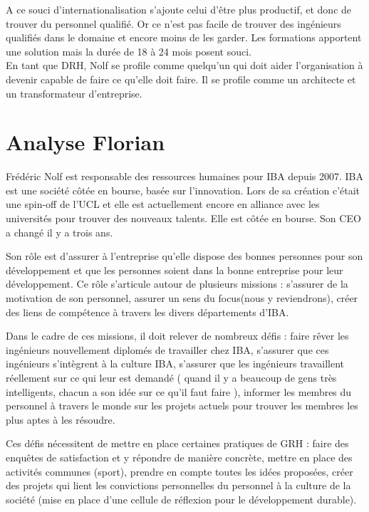 \documentclass[12pt]{article}
\begin{document}
A ce souci d'internationalisation s'ajoute celui d'être plus productif, et donc de trouver du personnel qualifié. Or ce n'est pas facile de trouver des ingénieurs qualifiés dans le domaine et encore moins de les garder. Les formations apportent une solution mais la durée de 18 à 24 mois posent souci.\\ 

En tant que DRH, Nolf se profile comme quelqu'un qui doit aider l'organisation à devenir capable de faire ce qu'elle doit faire. Il se profile comme un architecte et un transformateur d'entreprise.

\section{Analyse Florian}

Frédéric Nolf est responsable des ressources humaines pour IBA depuis 2007. IBA est une société côtée en bourse, basée sur l'innovation. Lors de sa création c'était une spin-off de l'UCL et elle est actuellement encore en alliance avec les universités pour trouver des nouveaux talents. Elle est côtée en bourse. Son CEO a changé il y a trois ans.

Son rôle est d'assurer à l'entreprise qu'elle dispose des bonnes personnes pour son développement et que les personnes soient dans la bonne entreprise pour leur développement. Ce rôle s'articule autour de plusieurs missions : s'assurer de la motivation de son personnel, assurer un \og{} sens du focus\fg{}(nous y reviendrons), créer des liens de compétence à travers les divers départements d'IBA.

Dans le cadre de ces missions, il doit relever de nombreux défis : faire rêver les ingénieurs nouvellement diplomés de travailler chez IBA, s'assurer que ces ingénieurs s'intègrent à la culture IBA, s'assurer que les ingénieurs travaillent réellement sur ce qui leur est demandé (\og{} quand il y a beaucoup de gens très intelligents, chacun a son idée sur ce qu'il faut faire \fg{}), informer les membres du personnel à travers le monde sur les projets actuels pour trouver les membres les plus aptes à les résoudre.

Ces défis nécessitent de mettre en place certaines pratiques de GRH : faire des enquêtes de satisfaction et y répondre de manière concrète, mettre en place des activités communes (sport), prendre en compte toutes les idées proposées, créer des projets qui lient les convictions personnelles du personnel à la culture de la société (mise en place d'une cellule de réflexion pour le développement durable).
\end{document}
